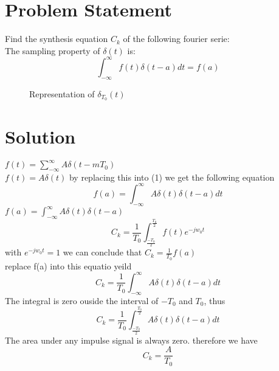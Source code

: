 \documentclass[12pt,letterpaper]{article}
\begin{document}
\begin{pycode}
\end{pycode}
\section{Problem  Statement}
Find the synthesis equation \(C_k\) of the following fourier serie:\\
The sampling property of  \(\delta(t)\) is: \\
\begin{equation}
    \int_{-\infty}^{\infty} f(t)\delta(t-a) dt = f(a)
\end{equation}
\begin{figure}[h]
    \caption{Representation of \(\delta_{T_0}(t)\)}
\end{figure}
\section{Solution}
    \(f(t)= \sum_{-\infty}^{\infty}  A\delta(t-mT_0)\)\\
     \(f(t)=  A\delta(t)\) by replacing this into (1) we get the following equation
     \begin{equation}
        f(a)= \int_{-\infty}^{\infty}  A\delta(t)\delta(t-a) dt
    \end{equation}
         \(f(a)= \int_{-\infty}^{\infty}  A\delta(t)\delta(t-a)\) \\
    \begin{equation}
        C_k = \frac{1}{T_0} \int_{\frac{-T_0}{2}}^{\frac{T_0}{2}} f(t) e^{-jw_0t} 
    \end{equation}
 with \(e^{-jw_0t}=1\) we can conclude that \(C_k=\frac{1}{T_0}f(a)\)\\
 replace f(a) into this equatio  yeild\\
 \begin{equation}
     C_k= \frac{1}{T_0}\int_{-\infty}^{\infty}  A\delta(t)\delta(t-a) dt
 \end{equation}
 The integral is zero ouside the interval of \(-T_0\) and \(T_0\), thus
 \begin{equation}
    C_k= \frac{1}{T_0}\int_{\frac{-T_0}{2}}^{\frac{T_0}{2}}  A\delta(t)\delta(t-a) dt
\end{equation}
The area under any impulse signal is always zero. therefore we have 
\begin{equation}
    C_k= \frac{A}{T_0}
\end{equation}
\end{document}
